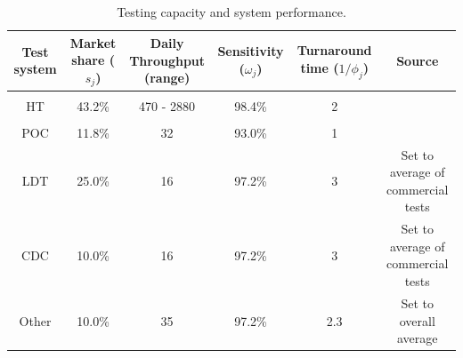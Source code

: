 \documentclass{article}
\begin{document}
\begin{table}
\begin{center}
\begin{tabular}{|c|c|c|c|c|c|}
\hline
Test system & Market share ($s_j$) & \makecell{Daily \\ Throughput \\ (range)} & Sensitivity ($\omega_j$) & \makecell{Turnaround \\ time ($1/\phi_j$)} & Source \\
\hline
 &  &  &  &  & \citet{Poljak:2020} \\
HT & 43.2\% & 470 - 2880 & 98.4\% & 2 & \citet{Degli-Angeli:2020} \\
 &  &  &  &  & \citet{Hogan:2020} \\
 \hline
POC & 11.8\% & 32 & 93.0\% & 1 & \citet{Zhen:2020} \\
\hline
LDT & 25.0\% & 16 & 97.2\% & 3 & Set to average of commercial tests \\
\hline
CDC & 10.0\% & 16 & 97.2\% & 3 & Set to average of commercial tests \\
\hline
Other & 10.0\% & 35 & 97.2\% & 2.3 & Set to overall average \\
\hline
\end{tabular}
\caption{Testing capacity and system performance.}
\label{tab:tests}
\end{center}
\end{table}
\end{document}
